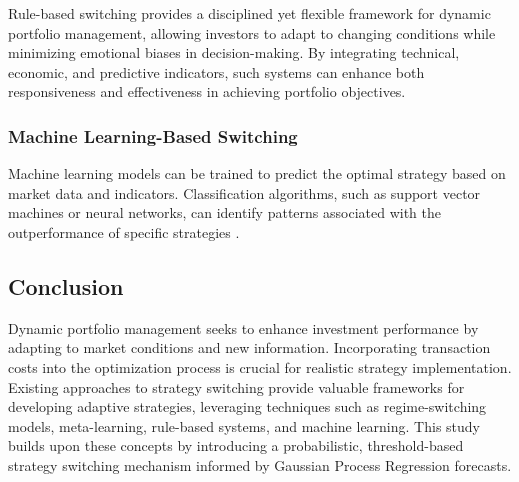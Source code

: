 Rule-based switching provides a disciplined yet flexible framework for dynamic portfolio management, allowing investors to adapt to changing conditions while minimizing emotional biases in decision-making. By integrating technical, economic, and predictive indicators, such systems can enhance both responsiveness and effectiveness in achieving portfolio objectives.


\subsubsection{Machine Learning-Based Switching}

Machine learning models can be trained to predict the optimal strategy based on market data and indicators. Classification algorithms, such as support vector machines or neural networks, can identify patterns associated with the outperformance of specific strategies \cite{fernandez2018machine}.

\subsection{Conclusion}

Dynamic portfolio management seeks to enhance investment performance by adapting to market conditions and new information. Incorporating transaction costs into the optimization process is crucial for realistic strategy implementation. Existing approaches to strategy switching provide valuable frameworks for developing adaptive strategies, leveraging techniques such as regime-switching models, meta-learning, rule-based systems, and machine learning. This study builds upon these concepts by introducing a probabilistic, threshold-based strategy switching mechanism informed by Gaussian Process Regression forecasts.




